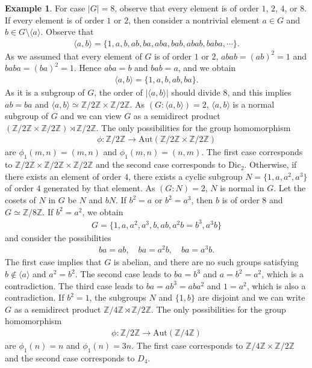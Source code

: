 \documentclass[12pt]{report}
\theoremstyle{plain}
\theoremstyle{remark}
\theoremstyle{definition}
\newtheorem{example}[theorem]{Example}
\newcommand{\Z}{\mathbb{Z}}
\begin{document}
\begin{example}
    For case $|G|=8$, observe that every element is of order $1$, $2$, $4$, or $8$. If every element is of order $1$ or $2$, then consider a nontrivial element $a\in G$ and $b\in G\setminus \langle a\rangle$. Observe that
    \begin{align*}
        \langle a,b\rangle = \{1,a,b,ab,ba,aba,bab,abab,baba,\cdots\}.
    \end{align*}
    As we assumed that every element of $G$ is of order $1$ or $2$, $abab = (ab)^2 = 1$ and $baba=(ba)^2=1$. Hence $aba = b$ and $bab=a$, and we obtain
    \begin{align*}
        \langle a,b\rangle = \{1,a,b,ab,ba\}.
    \end{align*}
    As it is a subgroup of $G$, the order of $|\langle a,b\rangle|$ should divide $8$, and this implies $ab=ba$ and $\langle a,b\rangle \simeq \Z/2\Z\times\Z/2\Z$. As $(G:\langle a,b\rangle)=2$, $\langle a,b\rangle$ is a normal subgroup of $G$ and we can view $G$ as a semidirect product $(\Z/2\Z\times\Z/2\Z)\rtimes \Z/2\Z$. The only possibilities for the group homomorphism
        \begin{align*}
            \phi:\Z/2\Z\rightarrow \mathrm{Aut}(\Z/2\Z\times\Z/2\Z)
        \end{align*}
        are $\phi_1(m,n)=(m,n)$ and $\phi_1(m,n)=(n,m)$. The first case corresponds to $\Z/2\Z\times\Z/2\Z\times\Z/2\Z$ and the second case corresponds to $\mathrm{Dic}_2$. Otherwise, if there exists an element of order $4$, there exists a cyclic subgroup $N=\{1,a,a^2,a^3\}$ of order $4$ generated by that element. As $(G:N)=2$, $N$ is normal in $G$. Let the cosets of $N$ in $G$ be $N$ and $bN$. If $b^2=a$ or $b^2=a^3$, then $b$ is of order $8$ and $G\simeq \Z/8\Z$. If $b^2 = a^2$, we obtain
        \begin{align*}
            G=\{1,a,a^2,a^3,b,ab,a^2b=b^3,a^3b\}
        \end{align*}
        and consider the possibilities
        \begin{align*}
            ba=ab,\quad ba=a^2b,\quad ba=a^3b.
        \end{align*}
        The first case implies that $G$ is abelian, and there are no such groups satisfying $b\notin \langle a\rangle$ and $a^2=b^2$. The second case leads to $ba=b^3$ and $a=b^2=a^2$, which is a contradiction. The third case leads to $ba=ab^3=aba^2$ and $1=a^2$, which is also a contradiction. If $b^2=1$, the subgroups $N$ and $\{1,b\}$ are disjoint and we can write $G$ as a semidirect product $\Z/4\Z\rtimes\Z/2\Z$. The only possibilities for the group homomorphism
        \begin{align*}
            \phi:\Z/2\Z\rightarrow \mathrm{Aut}(\Z/4\Z)
        \end{align*}
        are $\phi_1(n)=n$ and $\phi_1(n)=3n$. The first case corresponds to $\Z/4\Z\times\Z/2\Z$ and the second case corresponds to $D_4$.
\end{example}
\end{document}
